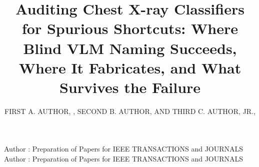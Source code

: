\documentclass{ieeeaccess}
\begin{document}

\title{Auditing Chest X-ray Classifiers for Spurious Shortcuts: Where Blind
VLM Naming Succeeds, Where It Fabricates, and What Survives the Failure}
\author{\uppercase{First A. Author}, ,
\uppercase{Second B. Author, and Third C. Author,
Jr}.,
}
\address[1]{National Institute of Standards and
Technology, Boulder, CO 80305 USA (e-mail: author@boulder.nist.gov)}
\address[2]{Department of Physics, Colorado State University, Fort Collins,
CO 80523 USA (e-mail: author@lamar.colostate.edu)}
\address[3]{Electrical Engineering Department, University of Colorado, Boulder, CO
80309 USA}

\markboth
{Author \headeretal: Preparation of Papers for IEEE TRANSACTIONS and JOURNALS}
{Author \headeretal: Preparation of Papers for IEEE TRANSACTIONS and JOURNALS}

\end{document}
